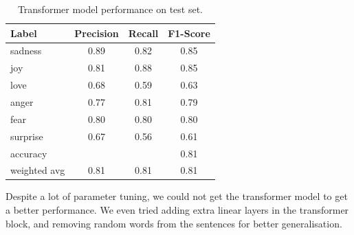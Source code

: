 \begin{table}[H]
    \vspace*{-0.5cm}
    \centering
    \begin{tabular}{|l|c|c|c|}
        \hline
        Label        & Precision & Recall & F1-Score \\ \hline
        sadness      & 0.89      & 0.82   & 0.85     \\ \hline
        joy          & 0.81      & 0.88   & 0.85     \\ \hline
        love         & 0.68      & 0.59   & 0.63     \\ \hline
        anger        & 0.77      & 0.81   & 0.79     \\ \hline
        fear         & 0.80      & 0.80   & 0.80     \\ \hline
        surprise     & 0.67      & 0.56   & 0.61     \\ \hline\hline
        accuracy     &           &        & 0.81     \\ \hline
        weighted avg & 0.81      & 0.81   & 0.81     \\ \hline
    \end{tabular}
    \caption{Transformer model performance on test set.}
    \label{tab:rnn_lstm_model_test}
    \vspace*{-0.8cm}
\end{table}

Despite a lot of parameter tuning, we could not get the transformer model to get a better performance. We even tried adding extra linear layers in the transformer block, and removing random words from the sentences for better generalisation.
